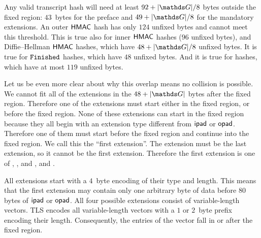 Any valid transcript hash will need at least $92+|\G|/8$ bytes outside the fixed region: $43$~bytes for the preface and $49+|\G|/8$ for the mandatory extensions. An outer $\mathsf{HMAC}$ hash has only $124$ unfixed bytes and cannot meet this threshold. 
This is true also for inner $\mathsf{HMAC}$ hashes ($96$ unfixed bytes), and Diffie--Hellman $\mathsf{HMAC}$ hashes, which have $48+|\G|/8$ unfixed bytes. 
It is true for $\mathtt{Finished}$ hashes, which have $48$ unfixed bytes. 
And it is true for  hashes, which have at most $119$ unfixed bytes.

Let us be even more clear about why this overlap means no collision is possible. 
We cannot fit all of the extensions in the $48+|\G|$ bytes after the fixed region. 
Therefore one of the extensions must start either in the fixed region, or before the fixed region. 
None of these extensions can start in the fixed region because they all begin with an extension type different from $\mathsf{ipad}$ or $\mathsf{opad}$. 
Therefore one of them must start before the fixed region and continue into the fixed region. 
We call this the ``first extension''.
The  extension must be the last extension, so it cannot be the first extension.
Therefore  the first extension is one of , , and , and .

All extensions start with a $4$~byte encoding of their type and length. 
This means that the first extension may contain only one arbitrary byte of data before $80$ bytes of $\mathsf{ipad}$ or $\mathsf{opad}$. All four possible extensions consist of variable-length vectors. TLS encodes all variable-length vectors with a $1$ or $2$~byte prefix encoding their length. Consequently, the entries of the vector fall in or after the fixed region. 

